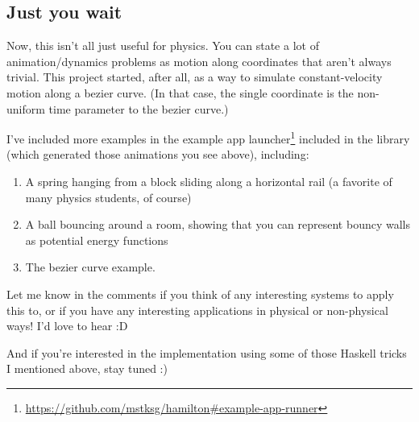 \documentclass[]{article}
\renewcommand{\href}[2]{#2\footnote{\url{#1}}}
\begin{document}
\subsection{Just you wait}\label{just-you-wait}

Now, this isn't all just useful for physics. You can state a lot of
animation/dynamics problems as motion along coordinates that aren't always
trivial. This project started, after all, as a way to simulate constant-velocity
motion along a bezier curve. (In that case, the single coordinate is the
non-uniform time parameter to the bezier curve.)

I've included more examples in the
\href{https://github.com/mstksg/hamilton\#example-app-runner}{example app
launcher} included in the library (which generated those animations you see
above), including:

\begin{enumerate}
\def\labelenumi{\arabic{enumi}.}
\tightlist
\item
  A spring hanging from a block sliding along a horizontal rail (a favorite of
  many physics students, of course)
\item
  A ball bouncing around a room, showing that you can represent bouncy walls as
  potential energy functions
\item
  The bezier curve example.
\end{enumerate}

Let me know in the comments if you think of any interesting systems to apply
this to, or if you have any interesting applications in physical or non-physical
ways! I'd love to hear :D

And if you're interested in the implementation using some of those Haskell
tricks I mentioned above, stay tuned :)
\end{document}
